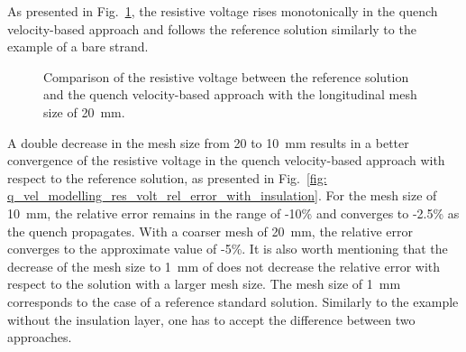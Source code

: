 As presented in Fig.~\ref{fig: q_vel_modelling_res_volt_benchmarking_with_insulation}, the resistive voltage rises monotonically in the quench velocity-based approach and follows the reference solution similarly to the example of a bare strand. 

\begin{figure}[H]
\centering
    \caption{Comparison of the resistive voltage between the reference solution and the quench velocity-based approach with the longitudinal mesh size of 20~mm.}
    \label{fig: q_vel_modelling_res_volt_benchmarking_with_insulation}
\end{figure}

A double decrease in the mesh size from 20 to 10~mm results in a better convergence of the resistive voltage in the quench velocity-based approach with respect to the reference solution, as presented in Fig.~\ref{fig: q_vel_modelling_res_volt_rel_error_with_insulation}. For the mesh size of 10~mm, the relative error remains in the range of -10\% and converges to -2.5\% as the quench propagates. With a coarser mesh of 20~mm, the relative error converges to the approximate value of -5\%. It is also worth mentioning that the decrease of the mesh size to 1~mm of does not decrease the relative error with respect to the solution with a larger mesh size. The mesh size of 1~mm corresponds to the case of a reference standard solution. Similarly to the example without the insulation layer, one has to accept the difference between two approaches.

